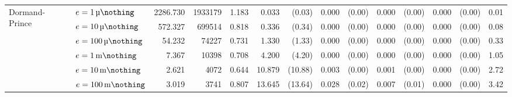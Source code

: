 \begin{sidewaystable}[p]
\begin{tabular}{p{1.5cm} l r r r rr rr rr rr r}
	\multirow{6}{*}{\parbox{1.5cm}{\raggedleft Dormand-Prince}}
		& $e=\SI{1}{\micro\nothing}$	&   2286.730	&  1933179	&      1.183	&      0.033	& (0.03)	&      0.000	& (0.00)	&      0.000	& (0.00)	&      0.000	& (0.00)	& 0.01\\
		& $e=\SI{10}{\micro\nothing}$	&    572.327	&   699514	&      0.818	&      0.336	& (0.34)	&      0.000	& (0.00)	&      0.000	& (0.00)	&      0.000	& (0.00)	& 0.08\\
		& $e=\SI{100}{\micro\nothing}$	&     54.232	&    74227	&      0.731	&      1.330	& (1.33)	&      0.000	& (0.00)	&      0.000	& (0.00)	&      0.000	& (0.00)	& 0.33\\
		& $e=\SI{1}{\milli\nothing}$	&      7.367	&    10398	&      0.708	&      4.200	& (4.20)	&      0.000	& (0.00)	&      0.000	& (0.00)	&      0.000	& (0.00)	& 1.05\\
		& $e=\SI{10}{\milli\nothing}$	&      2.621	&     4072	&      0.644	&     10.879	& (10.88)	&      0.003	& (0.00)	&      0.001	& (0.00)	&      0.000	& (0.00)	& 2.72\\
		& $e=\SI{100}{\milli\nothing}$	&      3.019	&     3741	&      0.807	&     13.645	& (13.64)	&      0.028	& (0.02)	&      0.007	& (0.01)	&      0.000	& (0.00)	& 3.42\\
	\bottomrule
\end{tabular}
\label{tbl:integrator_ifcondexp}
\end{sidewaystable}


